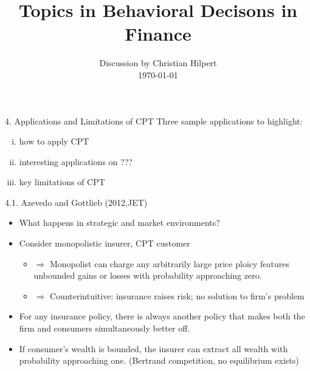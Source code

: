 \documentclass[11pt,aspectratio=169]{beamer}
\begin{document}

\title{Topics in Behavioral Decisons in Finance}
\date{Discussion by Christian Hilpert\\ \today}
\begin{frame}
    \titlepage
\end{frame}


\begin{frame}{4. Applications and Limitations of CPT}
Three sample applications to highlight:
    \begin{enumerate}[i)]
        \item how to apply CPT \\
        \item interesting applications on ???\\
        \item key limitations of CPT\\
    \end{enumerate}
  
\end{frame}


\begin{frame}{4.1. Azevedo and Gottlieb (2012,JET) }
    \begin{itemize}
        \item What happens in strategic and market environments? \medskip
        \item Consider monopolistic insurer, CPT customer\medskip
        \begin{itemize}
            \item $\Rightarrow$ Monopolist can charge any arbitrarily large price ploicy features unbounded gains or losses with probability approaching zero.\medskip
            \item $\Rightarrow$ Counterintuitive: insurance raises risk; no solution to firm's problem\medskip
        \end{itemize}
        \item  For any insurance policy, there is always another policy that makes both the firm
        and consumers simultaneously better off. \medskip
        \item  If consumer's wealth is bounded, the insurer can extract all wealth with probability approaching one. (Bertrand competition, no equilibrium exists) \medskip
    \end{itemize}
\end{frame}
\end{document}
